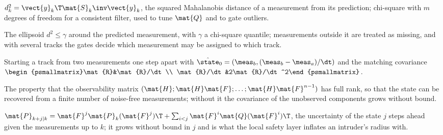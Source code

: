 \item[Normalized innovation squared (NIS)] $d^2_k=\vect{y}_k\T\mat{S}_k\inv\vect{y}_k$, the squared Mahalanobis distance of a measurement from its prediction; chi-square with $m$ degrees of freedom for a consistent filter, used to tune $\mat{Q}$ and to gate outliers.
\item[Validation gate] The ellipsoid $d^2\le\gamma$ around the predicted measurement, with $\gamma$ a chi-square quantile; measurements outside it are treated as missing, and with several tracks the gates decide which measurement may be assigned to which track.
\item[Two-point initialization] Starting a track from two measurements one step apart with $\hat{\state}_0=(\meas_b,(\meas_b-\meas_a)/\dt)$ and the matching covariance $\begin{psmallmatrix}\mat{R}&\mat{R}/\dt\\ \mat{R}/\dt&2\mat{R}/\dt^2\end{psmallmatrix}$.
\item[Observability] The property that the observability matrix $(\mat{H};\mat{H}\mat{F};\dots;\mat{H}\mat{F}^{n-1})$ has full rank, so that the state can be recovered from a finite number of noise-free measurements; without it the covariance of the unobserved components grows without bound.
\item[Prediction covariance] $\mat{P}_{k+j\mid k}=\mat{F}^j\mat{P}_k(\mat{F}^j)\T+\sum_{i<j}\mat{F}^i\mat{Q}(\mat{F}^i)\T$, the uncertainty of the state $j$ steps ahead given the measurements up to $k$; it grows without bound in $j$ and is what the local safety layer inflates an intruder's radius with.
